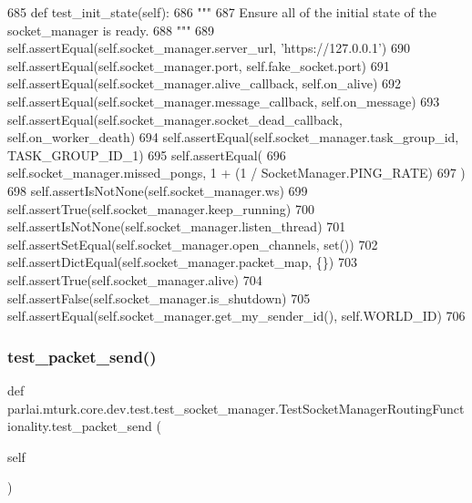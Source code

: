 \begin{DoxyCode}
685     \textcolor{keyword}{def }test\_init\_state(self):
686         \textcolor{stringliteral}{"""}
687 \textcolor{stringliteral}{        Ensure all of the initial state of the socket\_manager is ready.}
688 \textcolor{stringliteral}{        """}
689         self.assertEqual(self.socket\_manager.server\_url, \textcolor{stringliteral}{'https://127.0.0.1'})
690         self.assertEqual(self.socket\_manager.port, self.fake\_socket.port)
691         self.assertEqual(self.socket\_manager.alive\_callback, self.on\_alive)
692         self.assertEqual(self.socket\_manager.message\_callback, self.on\_message)
693         self.assertEqual(self.socket\_manager.socket\_dead\_callback, self.on\_worker\_death)
694         self.assertEqual(self.socket\_manager.task\_group\_id, TASK\_GROUP\_ID\_1)
695         self.assertEqual(
696             self.socket\_manager.missed\_pongs, 1 + (1 / SocketManager.PING\_RATE)
697         )
698         self.assertIsNotNone(self.socket\_manager.ws)
699         self.assertTrue(self.socket\_manager.keep\_running)
700         self.assertIsNotNone(self.socket\_manager.listen\_thread)
701         self.assertSetEqual(self.socket\_manager.open\_channels, set())
702         self.assertDictEqual(self.socket\_manager.packet\_map, \{\})
703         self.assertTrue(self.socket\_manager.alive)
704         self.assertFalse(self.socket\_manager.is\_shutdown)
705         self.assertEqual(self.socket\_manager.get\_my\_sender\_id(), self.WORLD\_ID)
706 
\end{DoxyCode}
\mbox{\label{classparlai_1_1mturk_1_1core_1_1dev_1_1test_1_1test__socket__manager_1_1TestSocketManagerRoutingFunctionality_ad4a3afda261c85447c2b6fa0907592b6}} 
\subsubsection{\texorpdfstring{test\+\_\+packet\+\_\+send()}{test\_packet\_send()}}
{\footnotesize\ttfamily def parlai.\+mturk.\+core.\+dev.\+test.\+test\+\_\+socket\+\_\+manager.\+Test\+Socket\+Manager\+Routing\+Functionality.\+test\+\_\+packet\+\_\+send (\begin{DoxyParamCaption}\item[{}]{self }\end{DoxyParamCaption})}

